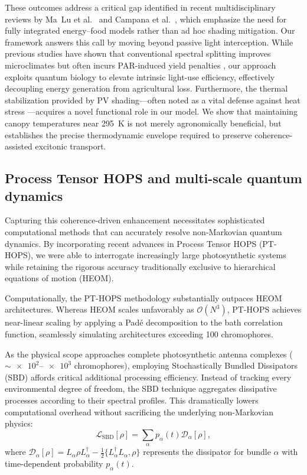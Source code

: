 These outcomes address a critical gap identified in recent multidisciplinary reviews by Ma~Lu et al.\ \cite{MaLu2025} and Campana et al.\ \cite{Campana2025}, which emphasize the need for fully integrated energy--food models rather than ad hoc shading mitigation. Our framework answers this call by moving beyond passive light interception. While previous studies have shown that conventional spectral splitting improves microclimates but often incurs PAR-induced yield penalties \cite{Asaa2024, Vu2025}, our approach exploits quantum biology to elevate intrinsic light-use efficiency, effectively decoupling energy generation from agricultural loss. Furthermore, the thermal stabilization provided by PV shading---often noted as a vital defense against heat stress \cite{Scarano2024}---acquires a novel functional role in our model. We show that maintaining canopy temperatures near \SI{295}{\kelvin} is not merely agronomically beneficial, but establishes the precise thermodynamic envelope required to preserve coherence-assisted excitonic transport.

\subsection{Process Tensor HOPS and multi-scale quantum dynamics}

Capturing this coherence-driven enhancement necessitates sophisticated computational methods that can accurately resolve non-Markovian quantum dynamics. By incorporating recent advances in Process Tensor HOPS (PT-HOPS), we were able to interrogate increasingly large photosynthetic systems while retaining the rigorous accuracy traditionally exclusive to hierarchical equations of motion (HEOM).

Computationally, the PT-HOPS methodology substantially outpaces HEOM architectures. Whereas HEOM scales unfavorably as $\mathcal{O}(N^3)$, PT-HOPS achieves near-linear scaling by applying a Padé decomposition to the bath correlation function, seamlessly simulating architectures exceeding 100 chromophores.

As the physical scope approaches complete photosynthetic antenna complexes ($\sim \numrange{e2}{e3}$ chromophores), employing Stochastically Bundled Dissipators (SBD) affords critical additional processing efficiency. Instead of tracking every environmental degree of freedom, the SBD technique aggregates dissipative processes according to their spectral profiles. This dramatically lowers computational overhead without sacrificing the underlying non-Markovian physics:
\begin{equation}\label{eq:sbd_operator_main}
\mathcal{L}_{\mathrm{SBD}}[\rho] = \sum_{\alpha} p_{\alpha}(t) \mathcal{D}_{\alpha}[\rho],
\end{equation}
where $\mathcal{D}_{\alpha}[\rho] = L_{\alpha} \rho L_{\alpha}^{\dagger} - \frac{1}{2}\{L_{\alpha}^{\dagger}L_{\alpha}, \rho\}$ represents the dissipator for bundle $\alpha$ with time-dependent probability $p_{\alpha}(t)$.

